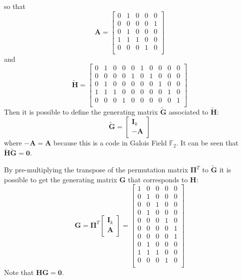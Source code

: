 \documentclass[10pt]{article}
\begin{document}
so that 
\begin{equation}
	\mathbf{A} = 
	\begin{bmatrix}
		0&1&0&0&0\\0&0&0&0&1\\0&1&0&0&0\\1&1&1&0&0\\0&0&0&1&0\\
	\end{bmatrix}
\end{equation}
and 
\begin{equation}
	\mathbf{\tilde{H}} = 
	\begin{bmatrix}

		0&1&0&0&0&1&0&0&0&0\\0&0&0&0&1&0&1&0&0&0\\0&1&0&0&0&0&0&1&0&0\\1&1&1&0&0&0&0&0&1&0\\0&0&0&1&0&0&0&0&0&1\\
	\end{bmatrix}
\end{equation}
Then it is possible to define the generating matrix $\mathbf{\tilde{G}}$ associated to $\mathbf{\tilde{H}}$:
\begin{equation}
	\mathbf{\tilde{G}} = 
	\begin{bmatrix}
		\mathbf{I}_k \\
		- \mathbf{A} \\
	\end{bmatrix}
\end{equation}
where $-\mathbf{A} = \mathbf{A}$ because this is a code in Galois Field $\mathbb{F}_2$. It can be seen that $\mathbf{\tilde{H}}\mathbf{\tilde{G}} = \mathbf{0}$.

By pre-multiplying the transpose of the permutation matrix $\mathbf{\Pi}^T$ to $\mathbf{\tilde{G}}$ it is possible to get the generating matrix $\mathbf{G}$ that corresponds to $\mathbf{H}$:
\begin{equation}
	\mathbf{G} = 
	\mathbf{\Pi}^T
	\begin{bmatrix}
		\mathbf{I}_k \\
		\mathbf{A} \\
	\end{bmatrix} = 
	\begin{bmatrix}
		1&0&0&0&0\\
		0&1&0&0&0\\
		0&0&1&0&0\\
		0&1&0&0&0\\
		0&0&0&1&0\\
		0&0&0&0&1\\
		0&0&0&0&1\\
		0&1&0&0&0\\
		1&1&1&0&0\\
		0&0&0&1&0\\
	\end{bmatrix}
\end{equation}
Note that $\mathbf{H}\mathbf{G} = \mathbf{0}$.
\end{document}
